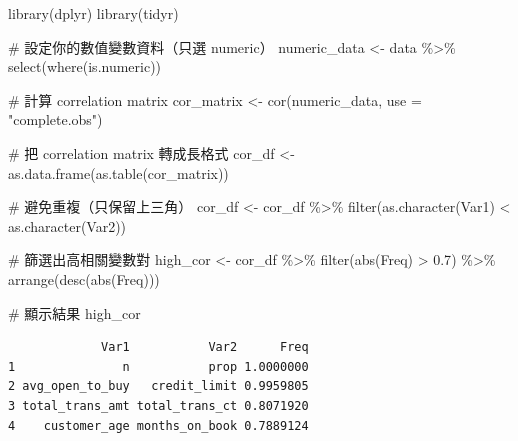 \documentclass[
  letterpaper,
  DIV=11,
  numbers=noendperiod]{scrartcl}
\newenvironment{Shaded}{\begin{snugshade}}{\end{snugshade}}
\newcommand{\AttributeTok}[1]{\textcolor[rgb]{0.40,0.45,0.13}{#1}}
\newcommand{\CommentTok}[1]{\textcolor[rgb]{0.37,0.37,0.37}{#1}}
\newcommand{\FloatTok}[1]{\textcolor[rgb]{0.68,0.00,0.00}{#1}}
\newcommand{\FunctionTok}[1]{\textcolor[rgb]{0.28,0.35,0.67}{#1}}
\newcommand{\NormalTok}[1]{\textcolor[rgb]{0.00,0.23,0.31}{#1}}
\newcommand{\OtherTok}[1]{\textcolor[rgb]{0.00,0.23,0.31}{#1}}
\newcommand{\SpecialCharTok}[1]{\textcolor[rgb]{0.37,0.37,0.37}{#1}}
\newcommand{\StringTok}[1]{\textcolor[rgb]{0.13,0.47,0.30}{#1}}
\begin{document}
\begin{Shaded}
\begin{Highlighting}[]
\FunctionTok{library}\NormalTok{(dplyr)}
\FunctionTok{library}\NormalTok{(tidyr)}

\CommentTok{\# 設定你的數值變數資料（只選 numeric）}
\NormalTok{numeric\_data }\OtherTok{\textless{}{-}}\NormalTok{ data }\SpecialCharTok{\%\textgreater{}\%} \FunctionTok{select}\NormalTok{(}\FunctionTok{where}\NormalTok{(is.numeric))}

\CommentTok{\# 計算 correlation matrix}
\NormalTok{cor\_matrix }\OtherTok{\textless{}{-}} \FunctionTok{cor}\NormalTok{(numeric\_data, }\AttributeTok{use =} \StringTok{"complete.obs"}\NormalTok{)}

\CommentTok{\# 把 correlation matrix 轉成長格式}
\NormalTok{cor\_df }\OtherTok{\textless{}{-}} \FunctionTok{as.data.frame}\NormalTok{(}\FunctionTok{as.table}\NormalTok{(cor\_matrix))}

\CommentTok{\# 避免重複（只保留上三角）}
\NormalTok{cor\_df }\OtherTok{\textless{}{-}}\NormalTok{ cor\_df }\SpecialCharTok{\%\textgreater{}\%}
  \FunctionTok{filter}\NormalTok{(}\FunctionTok{as.character}\NormalTok{(Var1) }\SpecialCharTok{\textless{}} \FunctionTok{as.character}\NormalTok{(Var2)) }

\CommentTok{\# 篩選出高相關變數對}
\NormalTok{high\_cor }\OtherTok{\textless{}{-}}\NormalTok{ cor\_df }\SpecialCharTok{\%\textgreater{}\%}
  \FunctionTok{filter}\NormalTok{(}\FunctionTok{abs}\NormalTok{(Freq) }\SpecialCharTok{\textgreater{}} \FloatTok{0.7}\NormalTok{) }\SpecialCharTok{\%\textgreater{}\%}
  \FunctionTok{arrange}\NormalTok{(}\FunctionTok{desc}\NormalTok{(}\FunctionTok{abs}\NormalTok{(Freq)))}

\CommentTok{\# 顯示結果}
\NormalTok{high\_cor}
\end{Highlighting}
\end{Shaded}

\begin{verbatim}
             Var1           Var2      Freq
1               n           prop 1.0000000
2 avg_open_to_buy   credit_limit 0.9959805
3 total_trans_amt total_trans_ct 0.8071920
4    customer_age months_on_book 0.7889124
\end{verbatim}
\end{document}
